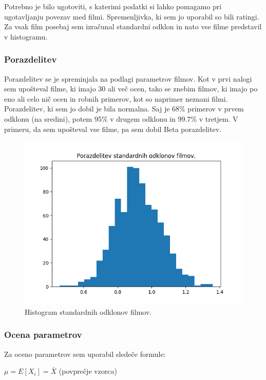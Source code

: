 \documentclass[a4paper,11pt]{article}
\begin{document}
Potrebno je bilo ugotoviti, s katerimi podatki si lahko pomagamo pri ugotavljanju povezav med filmi. Spremenljivka, ki sem jo uporabil so bili ratingi. Za vsak film posebaj sem izračunal standardni odklon in nato vse filme predstavil v histogramu.

\subsubsection{Porazdelitev}

Porazdelitev se je spreminjala na podlagi parametrov filmov. Kot v prvi nalogi sem upošteval filme, ki imajo 30 ali več ocen, tako se znebim filmov, ki imajo po eno ali celo nič ocen in robnih primerov, kot so naprimer neznani filmi. Porazdelitev, ki sem jo dobil je bila normalna. Saj je 68\% primerov v prvem odklonu (na sredini), potem 95\% v drugem odklonu in 99.7\% v tretjem. V primeru, da sem upošteval vse filme, pa sem dobil Beta porazdelitev.
\begin{figure}[htbp]
	\begin{center}
		\includegraphics[scale=0.6]{../slike/std_movie.png}
		\caption{Histogram standardnih odklonov filmov.}
		\label{zanri_slika}
	\end{center}
\end{figure}
\pagebreak

\subsubsection{Ocena parametrov}
Za oceno parametrov sem uporabil sledeče formule:

$\mu = E[X_i] = \bar{X}$   (povprečje vzorca)
\end{document}
